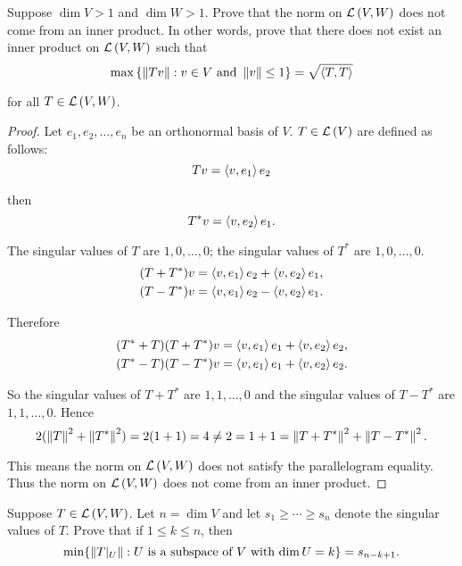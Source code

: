 \begin{exercise}
    Suppose $\dim V > 1$ and $\dim W > 1$. Prove that the norm on $\mathcal{L}\left({V, W}\right)$ does not come from an inner product. In other words, prove that there does not exist an inner product on $\mathcal{L}\left({V, W}\right)$ such that
    \[
        \max\left\{ \left\Vert{Tv}\right\Vert : v\in V\text{ and }\left\Vert{v}\right\Vert\leq 1 \right\} = \sqrt{\left\langle{T, T}\right\rangle}
    \]

    for all $T\in \mathcal{L}\left({V, W}\right)$.
\end{exercise}

\begin{proof}
    Let $e_{1}, e_{2}, \ldots, e_{n}$ be an orthonormal basis of $V$. $T\in\mathcal{L}\left({V}\right)$ are defined as follows:
    \[
        Tv = \left\langle{v,e_{1}}\right\rangle e_{2}
    \]

    then
    \[
        T^{*}v = \left\langle{v,e_{2}}\right\rangle e_{1}.
    \]

    The singular values of $T$ are $1, 0, \ldots, 0$; the singular values of $T^{*}$ are $1, 0, \ldots, 0$.
    \begin{align*}
        (T + T^{*})v & = \left\langle{v, e_{1}}\right\rangle e_{2} + \left\langle{v, e_{2}}\right\rangle e_{1}, \\
        (T - T^{*})v & = \left\langle{v, e_{1}}\right\rangle e_{2} - \left\langle{v, e_{2}}\right\rangle e_{1}.
    \end{align*}

    Therefore
    \begin{align*}
        (T^{*} + T)(T + T^{*})v & = \left\langle{v, e_{1}}\right\rangle e_{1} + \left\langle{v, e_{2}}\right\rangle e_{2}, \\
        (T^{*} - T)(T - T^{*})v & = \left\langle{v, e_{1}}\right\rangle e_{1} + \left\langle{v, e_{2}}\right\rangle e_{2}.
    \end{align*}

    So the singular values of $T + T^{*}$ are $1, 1, \ldots, 0$ and the singular values of $T - T^{*}$ are $1, 1, \ldots, 0$. Hence
    \[
        2(\left\Vert{T}\right\Vert^{2} + \left\Vert{T^{*}}\right\Vert^{2}) = 2(1 + 1) = 4 \ne 2 = 1 + 1 = \left\Vert{T + T^{*}}\right\Vert^{2} + \left\Vert{T - T^{*}}\right\Vert^{2}.
    \]

    This means the norm on $\mathcal{L}\left({V, W}\right)$ does not satisfy the parallelogram equality. Thus the norm on $\mathcal{L}\left({V, W}\right)$ does not come from an inner product.
\end{proof}
\newpage

\begin{exercise}
    Suppose $T \in \mathcal{L}\left({V, W}\right)$. Let $n = \dim V$ and let $s_{1} \geq \cdots \geq s_{n}$ denote the singular values of $T$. Prove that if $1 \leq k \leq n$, then
    \[
        \min\{ \left\Vert{T\vert_{U}}\right\Vert: \text{$U$ is a subspace of $V$ with $\dim U = k$} \} = s_{n-k+1}.
    \]
\end{exercise}

